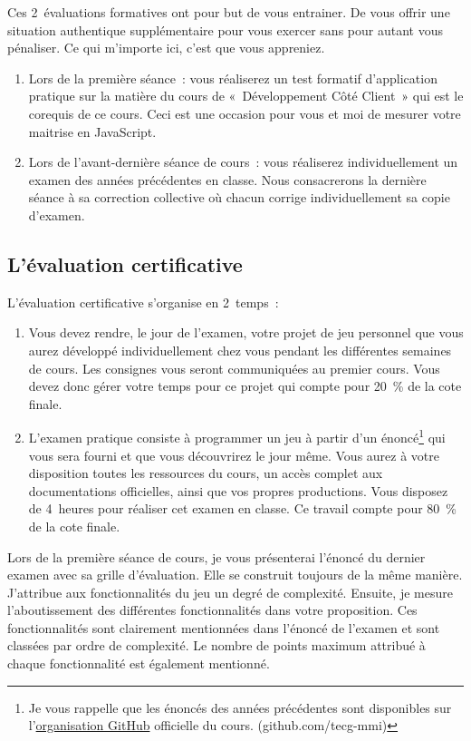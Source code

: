 Ces 2~évaluations formatives ont pour but de vous entrainer. De vous offrir une situation authentique supplémentaire pour vous exercer sans pour autant vous pénaliser. Ce qui m'importe ici, c'est que vous appreniez.
\begin{enumerate}
    \item Lors de la première séance~: vous réaliserez un test formatif d’application pratique sur la matière du cours de «~Développement Côté Client~» qui est le corequis de ce cours. Ceci est une occasion pour vous et moi de mesurer votre maitrise en JavaScript.
    \item Lors de l'avant-dernière séance de cours~: vous réaliserez individuellement un examen des années précédentes en classe. Nous consacrerons la dernière séance à sa correction collective où chacun corrige individuellement sa copie d'examen.
\end{enumerate}

\subsection{L’évaluation certificative}
\label{eval_certificative}
L’évaluation certificative s'organise en 2~temps~:
\begin{enumerate}
    \item Vous devez rendre, le jour de l'examen, votre projet de jeu personnel que vous aurez développé individuellement chez vous pendant les différentes semaines de cours. Les consignes vous seront communiquées au premier cours. Vous devez donc gérer votre temps pour ce projet qui compte pour 20~\% de la cote finale.
    \item L'examen pratique consiste à programmer un jeu à partir d'un énoncé\footnote{Je vous rappelle que les énoncés des années précédentes sont disponibles sur l'\href{https://github.com/tecg-mmi}{organisation GitHub} officielle du cours. (github.com/tecg-mmi)} qui vous sera fourni et que vous découvrirez le jour même. Vous aurez à votre disposition toutes les ressources du cours, un accès complet aux documentations officielles, ainsi que vos propres productions. Vous disposez de 4~heures pour réaliser cet examen en classe. Ce travail compte pour 80~\% de la cote finale.
\end{enumerate}
Lors de la première séance de cours, je vous présenterai l'énoncé du dernier examen avec sa grille d'évaluation. Elle se construit toujours de la même manière. J'attribue aux fonctionnalités du jeu un degré de complexité. Ensuite, je mesure l'aboutissement des différentes fonctionnalités dans votre proposition. Ces fonctionnalités sont clairement mentionnées dans l'énoncé de l'examen et sont classées par ordre de complexité. Le nombre de points maximum attribué à chaque fonctionnalité est également mentionné.

